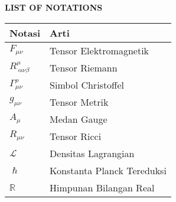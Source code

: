 \clearpage
{}
\begin{center}
  {\bfseries \Large LIST OF NOTATIONS}
\end{center}
\vspace{3em}


\begin{center}
  \begin{tabularx}{0.8\textwidth} {
      >{\raggedright\arraybackslash}X
      >{\raggedright\arraybackslash}X}
    \toprule
    \textbf{Notasi}              & \textbf{Arti}              \\
    \midrule
    $F_{\mu\nu}$                 & Tensor Elektromagnetik     \\
    $R^{\mu}_{\ \alpha\nu\beta}$ & Tensor Riemann             \\
    $\Gamma^{\rho}_{\mu\nu}$     & Simbol Christoffel         \\
    $g_{\mu\nu}$                 & Tensor Metrik              \\
    $A_\mu$                      & Medan Gauge                \\
    $R_{\mu\nu}$                 & Tensor Ricci               \\
    $\mathcal{L}$                & Densitas Lagrangian        \\
    $\hslash$                    & Konstanta Planck Tereduksi \\
    $\mathbb{R}$                 & Himpunan Bilangan Real     \\
    \bottomrule
  \end{tabularx}
\end{center}
